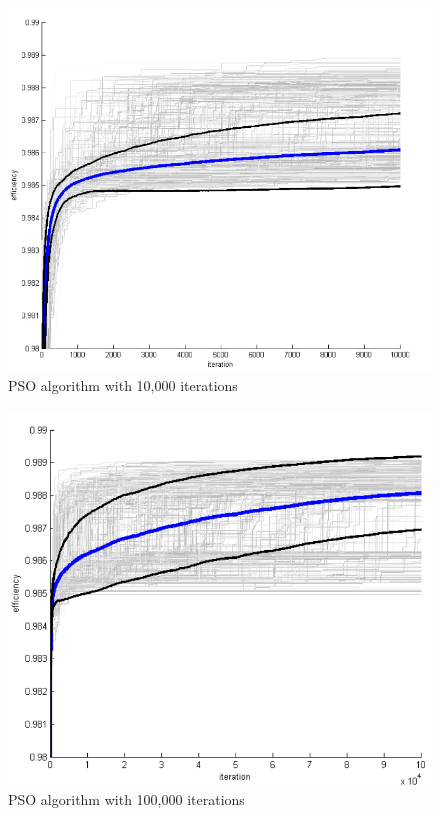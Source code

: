 \documentclass[twoside]{article}
\begin{document}
\begin{figure}[h!]
\includegraphics[width=\textwidth,height=\textheight,keepaspectratio]{PSO10k.png}
\caption{PSO algorithm with 10,000 iterations}
\end{figure}
\newpage
\begin{figure}[h!]
\includegraphics[width=\textwidth,height=\textheight,keepaspectratio]{PSO100k.png}
\caption{PSO algorithm with 100,000 iterations}
\end{figure}
\end{document}
